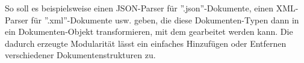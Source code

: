     So soll es beispielsweise einen JSON-Parser für ''.json''-Dokumente, einen XML-Parser für ''.xml''-Dokumente usw. geben, die diese Dokumenten-Typen dann in ein Dokumenten-Objekt transformieren, mit dem gearbeitet werden kann.
    Die dadurch erzeugte Modularität lässt ein einfaches Hinzufügen oder Entfernen verschiedener Dokumentenstrukturen zu.